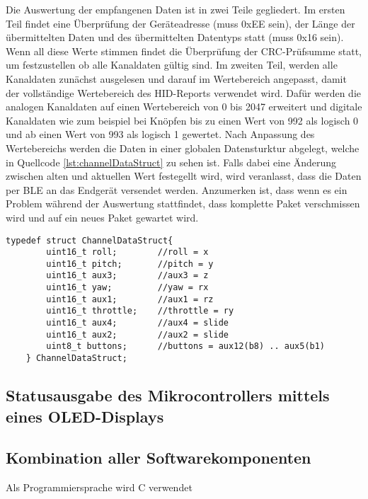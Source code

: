 Die Auswertung der empfangenen Daten ist in zwei Teile gegliedert. Im ersten Teil findet eine Überprüfung der Geräteadresse (muss 0xEE sein), der Länge der übermittelten Daten und des übermittelten Datentyps statt (muss 0x16 sein). Wenn all diese Werte stimmen findet die Überprüfung der \ac{CRC}-Prüfsumme statt, um festzustellen ob alle Kanaldaten gültig sind. Im zweiten Teil, werden alle Kanaldaten zunächst ausgelesen und darauf im Wertebereich angepasst, damit der vollständige Wertebereich des \ac{HID}-Reports verwendet wird. Dafür werden die analogen Kanaldaten auf einen Wertebereich von 0 bis 2047 erweitert und digitale Kanaldaten wie zum beispiel bei Knöpfen bis zu einen Wert von 992 als logisch 0 und ab einen Wert von 993 als logisch 1 gewertet. Nach Anpassung des Wertebereichs werden die Daten in einer globalen Datensturktur abgelegt, welche in Quellcode \ref{lst:channelDataStruct} zu sehen ist. Falls dabei eine Änderung zwischen alten und aktuellen Wert festegellt wird, wird veranlasst, dass die Daten per \ac{BLE} an das Endgerät versendet werden. Anzumerken ist, dass wenn es ein Problem während der Auswertung stattfindet, dass komplette Paket verschmissen wird und auf ein neues Paket gewartet wird.

\begin{lstlisting}[caption=C-Strukuraufbau der aufbereiteten Kanaldaten, label={lst:channelDataStruct}, style=generalStyle]
    typedef struct ChannelDataStruct{
        uint16_t roll;        //roll = x
        uint16_t pitch;       //pitch = y
        uint16_t aux3;        //aux3 = z
        uint16_t yaw;         //yaw = rx
        uint16_t aux1;        //aux1 = rz
        uint16_t throttle;    //throttle = ry
        uint16_t aux4;        //aux4 = slide
        uint16_t aux2;        //aux2 = slide
        uint8_t buttons;      //buttons = aux12(b8) .. aux5(b1)
    } ChannelDataStruct;
\end{lstlisting}

\subsection{Statusausgabe des Mikrocontrollers mittels eines OLED-Displays}

\subsection{Kombination aller Softwarekomponenten}
Als Programmiersprache wird C verwendet

